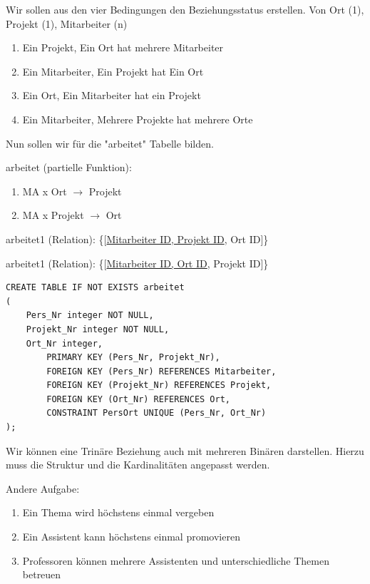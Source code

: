 \documentclass[a4paper]{article}
\begin{document}
Wir sollen aus den vier Bedingungen den Beziehungsstatus erstellen. Von Ort (1), Projekt (1), Mitarbeiter (n)

\begin{enumerate}
    \item Ein Projekt, Ein Ort hat mehrere Mitarbeiter
    \item Ein Mitarbeiter, Ein Projekt hat Ein Ort
    \item Ein Ort, Ein Mitarbeiter hat ein Projekt
    \item Ein Mitarbeiter, Mehrere Projekte hat mehrere Orte
\end{enumerate}

Nun sollen wir für die "arbeitet" Tabelle bilden.

arbeitet (partielle Funktion):

\begin{enumerate}
    \item MA x Ort $\rightarrow$ Projekt
    \item MA x Projekt $\rightarrow$ Ort
\end{enumerate}

arbeitet1 (Relation): \{[\underline{Mitarbeiter ID, Projekt ID}, Ort ID]\}

arbeitet1 (Relation): \{[\underline{Mitarbeiter ID, Ort ID}, Projekt ID]\}

\begin{lstlisting}
CREATE TABLE IF NOT EXISTS arbeitet
(
	Pers_Nr integer NOT NULL,
	Projekt_Nr integer NOT NULL,
	Ort_Nr integer,
        PRIMARY KEY (Pers_Nr, Projekt_Nr),
        FOREIGN KEY (Pers_Nr) REFERENCES Mitarbeiter,
        FOREIGN KEY (Projekt_Nr) REFERENCES Projekt,
        FOREIGN KEY (Ort_Nr) REFERENCES Ort,
        CONSTRAINT PersOrt UNIQUE (Pers_Nr, Ort_Nr) 
); 
\end{lstlisting}

Wir können eine Trinäre Beziehung auch mit mehreren Binären darstellen. Hierzu muss die Struktur und die Kardinalitäten angepasst werden.

Andere Aufgabe:

\begin{enumerate}
    \item Ein Thema wird höchstens einmal vergeben
    \item Ein Assistent kann höchstens einmal promovieren
    \item Professoren können mehrere Assistenten und unterschiedliche Themen betreuen
\end{enumerate}
\end{document}
